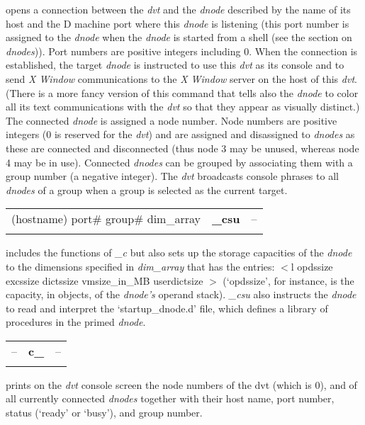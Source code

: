 \noindent opens a connection between the \emph{dvt} and the \emph{dnode} described by the name of its host and the D machine port where this \emph{dnode} is listening (this port number is assigned to the \emph{dnode} when the \emph{dnode} is started from a shell (see the section on \emph{dnodes})). Port numbers are positive integers including $0$. When the connection is established, the target \emph{dnode} is instructed to use this \emph{dvt} as its console and to send \emph{X Window} communications to the \emph{X Window} server on the host of this \emph{dvt}. (There is a more fancy version of this command that tells also the \emph{dnode} to color all its text communications with the \emph{dvt} so that they appear as visually distinct.) The connected \emph{dnode} is assigned a node number. Node numbers are positive integers ($0$ is reserved for the \emph{dvt}) and are assigned and disassigned to \emph{dnodes} as these are connected and disconnected (thus node 3 may be unused, whereas node 4 may be in use). Connected \emph{dnodes} can be grouped by associating them with a group number (a negative integer). The \emph{dvt} broadcasts console phrases to all \emph{dnodes} of a group when a group is selected as the current target.\\

\begin{tabular}{>{\sffamily}r>{\sffamily\bfseries}l>{\sffamily}l}
(hostname) port\# group\# dim\_array & \_csu & --\\\\
\end{tabular}

\noindent includes the functions of \emph{\_c} but also sets up the storage capacities of the \emph{dnode} to the dimensions specified in \emph{dim\_array} that has the entries: $<$l opdssize excssize dictssize vmsize\_in\_MB userdictsize $>$ (`opdssize', for instance, is the capacity, in objects, of the \emph{dnode's} operand stack). \emph{\_csu} also instructs the \emph{dnode} to read and interpret the `startup\_dnode.d' file, which defines a library of procedures in the primed \emph{dnode}.\\

\begin{tabular}{>{\sffamily}r>{\sffamily\bfseries}l>{\sffamily}l}
-- & c\_ & --\\\\
\end{tabular}

\noindent prints on the \emph{dvt} console screen the node numbers of the dvt (which is $0$), and of all currently connected \emph{dnodes} together with their host name, port number, status (`ready' or `busy'), and group number.\\  


